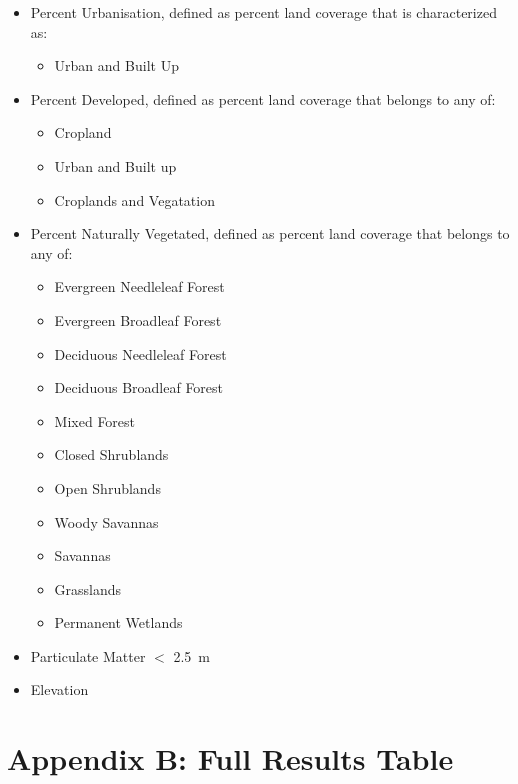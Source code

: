 \documentclass[prl,showpacs,superscriptaddress,twocolumn,longbibliography]{revtex4-1}
\begin{document}
\begin{itemize}
\item Percent Urbanisation, defined as percent land coverage that is characterized as:
\begin{itemize}
	\item Urban and Built Up\cite{nasa_landcov}
\end{itemize}
\item Percent Developed, defined as percent land coverage that belongs to any of:
\begin{itemize}
	\item Cropland
	\item Urban and Built up
	\item Croplands and Vegatation\cite{nasa_landcov}
\end{itemize}
\item Percent Naturally Vegetated, defined as percent land coverage that belongs to any of:
\begin{itemize}
	\item Evergreen Needleleaf Forest
	\item Evergreen Broadleaf Forest
	\item Deciduous Needleleaf Forest
	\item Deciduous Broadleaf Forest
	\item Mixed Forest
	\item Closed Shrublands
	\item Open Shrublands
	\item Woody Savannas
	\item Savannas
	\item Grasslands
	\item Permanent Wetlands\cite{nasa_landcov}
\end{itemize}
\item Particulate Matter $<$ 2.5~{\textmu}m \cite{van_donkelaar_global_2016}
\item Elevation\cite{nasa_srtm}
\end{itemize}

\section{Appendix B: Full Results Table} \label{appendix:results}
\end{document}
